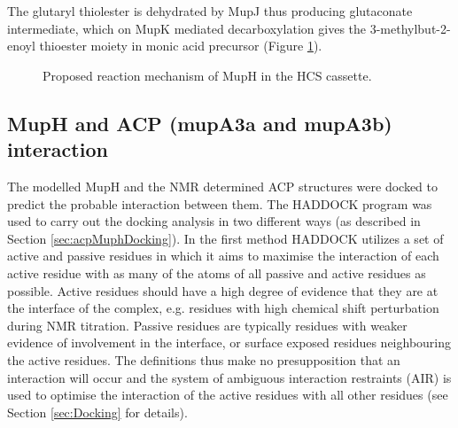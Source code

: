 	The glutaryl thiolester is dehydrated by MupJ thus producing glutaconate intermediate, which on MupK mediated decarboxylation gives the 3-methylbut-2-enoyl thioester moiety in monic acid precursor (Figure \ref{fig:muphreact}).
	
			\setlength\fboxsep{5pt}
			\setlength\fboxrule{1.5pt}
			\begin{figure} [!]
			\centering
			\caption[Proposed reaction mechanism of MupH in the HCS cassette.]{Proposed reaction mechanism of MupH in the HCS cassette.}
			\label{fig:muphreact}
			\end{figure}					

\newpage
			
	\subsection{MupH and ACP (mupA3a and mupA3b) interaction}
	\label{sec:MupHACPInteraction}
	The modelled MupH and the NMR determined ACP structures were docked to predict the probable interaction between them. The HADDOCK \parencite{DeVries2010} program was used to carry out the docking analysis in two different ways (as described in Section \ref{sec:acpMuphDocking}). In the first method HADDOCK utilizes a set of active and passive residues in which it aims to maximise the interaction of each active residue with as many of the atoms of all passive and active residues as possible. Active residues should have a high degree of evidence that they are at the interface of the complex, e.g. residues with high chemical shift perturbation during NMR titration. Passive residues are typically residues with weaker evidence of involvement in the interface, or surface exposed residues neighbouring the active residues. The definitions thus make no presupposition that an interaction will occur and the system of ambiguous interaction restraints (AIR) is used to optimise the interaction of the active residues with all other residues (see Section \ref{sec:Docking} for details).
	

